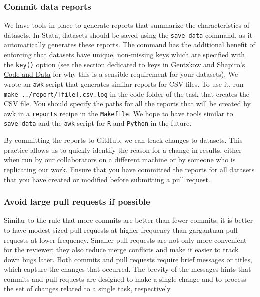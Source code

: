 \subsubsection{Commit data reports}
We have tools in place to generate reports that summarize the characteristics of datasets.
In Stata, datasets should be saved using the \texttt{save\_data} command,
as it automatically generates these reports.
The command has the additional benefit of enforcing that datasets have unique,
non-missing keys which are specified with the \texttt{key()} option
 (see the section dedicated to keys in \href{https://web.stanford.edu/~gentzkow/research/CodeAndData.pdf}{Gentzkow and Shapiro's Code and Data} for why this is a sensible requirement for your datasets).
We wrote an \texttt{awk} script that generates similar reports for CSV files.
To use it, run \texttt{make ../report/[file].csv.log}
in the code folder of the task that creates the CSV file.
You should specify the paths for all the reports that will be created by awk
in a \texttt{reports} recipe in the \texttt{Makefile}.
We hope to have tools similar to \texttt{save\_data} and the \texttt{awk} script
for \texttt{R} and \texttt{Python} in the future. %

By committing the reports to GitHub, we can track changes to datasets.
This practice allows us to quickly identify the reason for a change in results,
either when run by our collaborators on a different machine or by someone
who is replicating our work.
Ensure that you have committed the reports for all datasets
that you have created or modified before submitting a pull request.

\subsubsection{Avoid large pull requests if possible}
Similar to the rule that more commits are better than fewer commits,
it is better to have modest-sized pull requests at higher frequency
than gargantuan pull requests at lower frequency.
Smaller pull requests are not only more convenient for the reviewer;
they also reduce merge conflicts
and make it easier to track down bugs later.
Both commits and pull requests require brief messages or titles,
which capture the changes that occurred.
The brevity of the messages hints that commits and pull requests are designed
to make a single change and to process the set of changes related to a single task, respectively.

